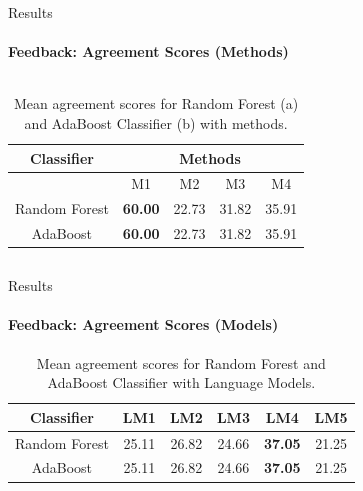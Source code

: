 \documentclass[aspectratio=169]{beamer}
\begin{document}
\begin{frame}{Results}
	\framesubtitle{Feedback: Agreement Scores (Methods)}
	\begin{columns}
		\begin{column}{1\textwidth}
	\begin{table}
			\centering
			\begin{tabular}{|c|c|c|c|c|}
				
				\hline
				\rowcolor{Gray}
				Classifier&\multicolumn{4}{|c|}{Methods}\\
				\hline
				 & M1 & M2 & M3 & M4 \\
				\hline
				Random Forest &\textbf{60.00}&22.73&31.82&35.91\\
				\hline
				AdaBoost &\textbf{60.00}&22.73&31.82&35.91\\
				\hline
			\end{tabular}
		
		\caption{Mean agreement scores for Random Forest (a) and AdaBoost Classifier (b) with methods.}
	\end{table}
\end{column}
\end{columns}
\end{frame}
\begin{frame}{Results}
	\framesubtitle{Feedback: Agreement Scores (Models)}
	\begin{table}
			\centering
			\begin{tabular}{|c|c|c|c|c|c|}
			\hline
			Classifier & LM1 & LM2 & LM3 & LM4 & LM5 \\
			\hline
			Random Forest &25.11& 26.82& 24.66& \textbf{37.05}& 21.25\\
			\hline
			AdaBoost &25.11& 26.82& 24.66& \textbf{37.05}& 21.25\\
			\hline
			\end{tabular}
		\caption{Mean agreement scores for Random Forest and AdaBoost Classifier with Language Models.}
	\end{table}
	
\end{frame}
\end{document}
